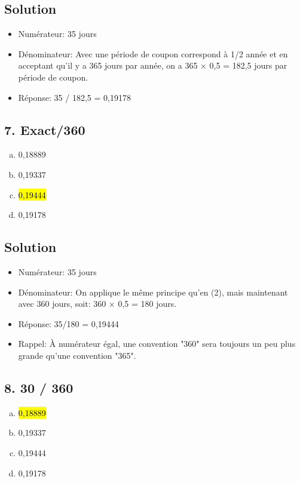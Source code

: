 \documentclass[10pt,a4paper]{article}
\begin{document}
\subsection*{Solution}
\begin{itemize}
\item Numérateur: 35 jours
\item Dénominateur: Avec une période de coupon correspond à 1/2 année et en acceptant qu'il y a 365 jours par année, on a 365 × 0,5 = 182,5 jours par période de coupon.
\item Réponse: 35 / 182,5 = 0,19178
\end{itemize}

\newpage


\subsection*{7. Exact/360}
\begin{enumerate}[a)]
\item 0,18889
\item 0,19337
\item \hl{0,19444}
\item 0,19178
\end{enumerate}
\subsection*{Solution}
\begin{itemize}
\item Numérateur: 35 jours
\item Dénominateur: On applique le même principe qu'en (2), mais maintenant avec 360 jours, soit: 360 × 0,5 = 180 jours.
\item Réponse: 35/180 = 0,19444
\item Rappel: À numérateur égal, une convention "360" sera toujours un peu plus grande qu'une convention "365".
\end{itemize}

\newpage

\subsection*{8. 30 / 360}
\begin{enumerate}[a)]
\item \hl{0,18889}
\item 0,19337
\item 0,19444
\item 0,19178
\end{enumerate}
\end{document}
